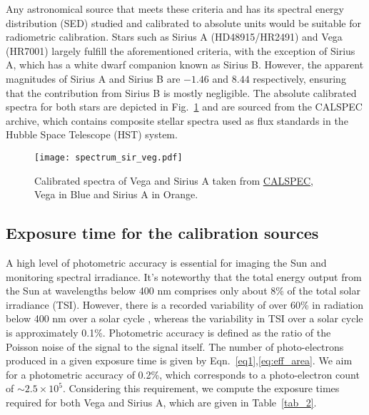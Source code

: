 Any astronomical source that meets these criteria and has its spectral energy distribution (SED) studied and calibrated to absolute units would be suitable for radiometric calibration. Stars such as Sirius A (HD48915/HR2491) and Vega (HR7001) largely fulfill the aforementioned criteria, with the exception of Sirius A, which has a white dwarf companion known as Sirius B. However, the apparent magnitudes of Sirius A and Sirius B are $-1.46$ \citep{hoffleit91} and $8.44$ \citep{mccook99,holberg13} respectively, ensuring that the contribution from Sirius B is mostly negligible. The absolute calibrated spectra for both stars are depicted in Fig.~\ref{fig:spec_1} and are sourced from the CALSPEC archive, which contains composite stellar spectra used as flux standards in the Hubble Space Telescope (HST) system.

\begin{figure}[ht!]
    \centering
    \texttt{[image: spectrum\_sir\_veg.pdf]}
    \caption[Spectra of Vega and Sirius A]{Calibrated spectra of Vega and Sirius A taken from \href{https://www.stsci.edu/hst/instrumentation/reference-data-for-calibration-and-tools/astronomical-catalogs/calspec}{CALSPEC}, Vega in Blue and Sirius A in Orange.}
    \label{fig:spec_1}
\end{figure}

\subsection{Exposure time for the calibration sources}\label{expo_time}

A high level of photometric accuracy is essential for imaging the Sun and monitoring spectral irradiance. It's noteworthy that the total energy output from the Sun at wavelengths below 400 nm comprises only about 8\% of the total solar irradiance (TSI). However, there is a recorded variability of over 60\% in radiation below 400 nm over a solar cycle \citep{krivova06}, whereas the variability in TSI over a solar cycle is approximately 0.1\%. Photometric accuracy is defined as the ratio of the Poisson noise of the signal to the signal itself. The number of photo-electrons produced in a given exposure time is given by Eqn.~\ref{eq1},\ref{eq:eff_area}. We aim for a photometric accuracy of 0.2\%, which corresponds to a photo-electron count of $\sim 2.5 \times 10^{5}$. Considering this requirement, we compute the exposure times required for both Vega and Sirius A, which are given in Table~\ref{tab_2}.

